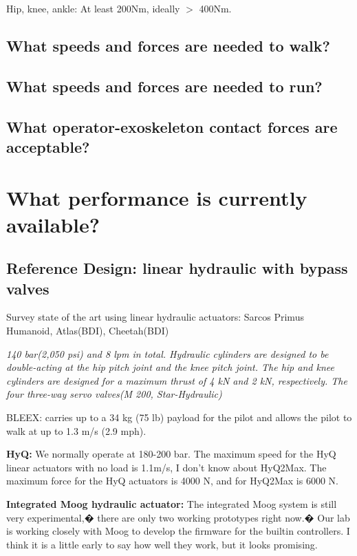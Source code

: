 \documentclass[letterpaper,12pt,fullpage]{article}
\begin{document}
Hip, knee, ankle: At least 200Nm, ideally $>$ 400Nm.

\subsection{What speeds and forces are needed to walk?}

\subsection{What speeds and forces are needed to run?}

\subsection{What operator-exoskeleton contact forces are acceptable?}

\section{What performance is currently available?}

\subsection{Reference Design: linear hydraulic with bypass valves}

Survey state of the art using linear hydraulic actuators:
Sarcos Primus Humanoid, Atlas(BDI), Cheetah(BDI)

{\it 140 bar(2,050 psi) and 8 lpm in total. Hydraulic cylinders
are designed to be double-acting at the hip pitch joint and
the knee pitch joint. The hip and knee cylinders are designed
for a maximum thrust of 4 kN and 2 kN, respectively. The
four three-way servo valves(M 200, Star-Hydraulic)}~\cite{IEEE07222598}

BLEEX: carries
up to a 34 kg (75 lb) payload for the pilot and allows the pilot to
walk at up to 1.3 m/s (2.9 mph).

{\bf HyQ:}
We normally operate at 180-200 bar. The maximum speed for the HyQ
linear actuators with no load is 1.1m/s, I don't know about HyQ2Max.
The maximum force for the HyQ actuators is 4000 N, and for HyQ2Max is
6000 N.

{\bf Integrated Moog hydraulic actuator:}
The integrated Moog system is still very experimental,� there are
only two working prototypes right now.� Our lab is working closely
with Moog to develop the firmware for the builtin controllers. I
think it is a little early to say how well they work, but it looks
promising.
\end{document}
